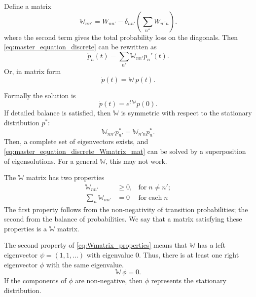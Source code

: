 \documentclass{book}
\numberwithin{equation}{section}
\theoremstyle{plain}
\theoremstyle{definition}
\theoremstyle{remark}
\theoremstyle{BoldStyle}
\numberwithin{exercise}{section}
\begin{document}
Define a matrix
\begin{equation}
  \mathbb W_{nn'} = W_{nn'} - \delta_{nn'} \left( \sum_{n''} W_{n'' n} \right).
  \label{eq:Wmatrix_discrete}
\end{equation}
%
where the second term gives the total probability loss
on the diagonals.
%
Then \eqref{eq:master_equation_discrete}
can be rewritten as
%
\begin{equation}
  \dot p_n(t) = \sum_{n'} \mathbb W_{nn'} p_n'(t).
  \label{eq:master_equation_discrete_Wmatrix}
\end{equation}
%
Or, in matrix form
%
\begin{equation}
  \dot p(t) = \mathbb W \, p(t).
  \label{eq:master_equation_discrete_Wmatrix_mat}
\end{equation}


Formally the solution is
%
\begin{equation}
  \dot p(t) = e^{t \, \mathbb W} p(0).
  \label{eq:pvec_solution}
\end{equation}
%
If detailed balance is satisfied, then $\mathbb W$ is symmetric with respect to
the stationary distribution $p^*$:
$$
\mathbb W_{n n'} p^*_{n'} = \mathbb W_{n' n} p^*_{n}.
$$
Then, a complete set of eigenvectors exists,
and \eqref{eq:master_equation_discrete_Wmatrix_mat}
can be solved by a superposition of eigensolutions.
%
For a general $\mathbb W$, this may not work.


The $\mathbb W$ matrix has two properties
\begin{equation}
  \begin{aligned}
    \mathbb W_{n n'} &\ge 0,   & \mathrm{for \;} n \ne n'; \\
    \sum_{n} \mathbb W_{n n'} &= 0 & \mathrm{for \; each \;} n
  \end{aligned}
  \label{eq:Wmatrix_properties}
\end{equation}
%
The first property follows from the non-negativity of transition probabilities;
%
the second from the balance of probabilities.
%
We say that a matrix satisfying these properties is a $\mathbb W$ matrix.

The second property of \eqref{eq:Wmatrix_properties}
means that $\mathbb W$ has a left eigenvector $\psi = (1, 1, \dots)$
with eigenvalue $0$.
%
Thus, there is at least one right eigenvector $\phi$ with the same eigenvalue.
$$
\mathbb W \, \phi = 0.
$$
If the components of $\phi$ are non-negative,
then $\phi$ represents the stationary distribution.
\end{document}
